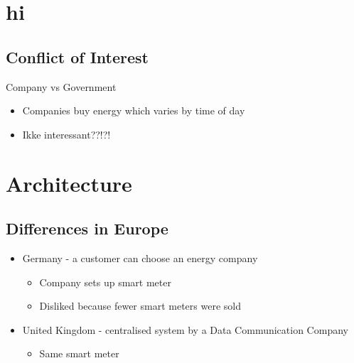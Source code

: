 \documentclass[10pt]{beamer}
\begin{document}
\section{hi}
\subsection{Conflict of Interest}
\begin{frame}{Company vs Government}
	\begin{itemize}
		\item Companies buy energy which varies by time of day
		\item Ikke interessant??!?!
	\end{itemize}
\end{frame}

\section{Architecture}
\subsection{Differences in Europe}
\begin{frame}
	\begin{itemize}
		\item Germany - a customer can choose an energy company
		\begin{itemize}
			\item Company sets up smart meter
			\item Disliked because fewer smart meters were sold
		\end{itemize}
		\item United Kingdom - centralised system by a Data Communication Company
			\begin{itemize}
				\item Same smart meter
			\end{itemize}
	\end{itemize}
\end{frame}

{\aauwavesbg
\begin{frame}
\end{frame}}
\end{document}
